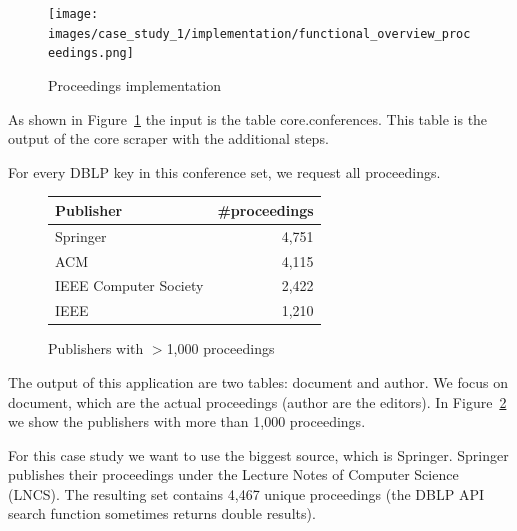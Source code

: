\documentclass{ou-report}
\begin{document}
\begin{figure}[H]
    \centering
    \texttt{[image: images/case\_study\_1/implementation/functional\_overview\_proceedings.png]}
    \caption{Proceedings implementation}
    \label{fig:functional_overview_proceedings}
\end{figure}

As shown in Figure~\ref{fig:functional_overview_proceedings} the input is the
table core.conferences. This table is the output of the core scraper with the 
additional steps.

For every DBLP key in this conference set, we request all proceedings.

\begin{figure}
    \centering
    \begin{tabular}{ lr }
        \toprule
        Publisher & \#proceedings \\
        \midrule
        Springer              & 4,751 \\
        ACM                   & 4,115 \\
        IEEE Computer Society & 2,422 \\
        IEEE                  & 1,210 \\
        \bottomrule
    \end{tabular}
    \caption{Publishers with $>$1,000 proceedings}
    \label{tbl:publisher-proceeding-count}
    
\end{figure}

The output of this application are two tables: document and author. We focus on
document, which are the actual proceedings (author are the editors).
In Figure~\ref{tbl:publisher-proceeding-count} we show the publishers with 
more than 1,000 proceedings.

For this case study we want to use the biggest source, which is Springer. 
Springer publishes their proceedings under the Lecture 
Notes of Computer Science (LNCS). The resulting set contains 4,467 unique 
proceedings (the DBLP API search function sometimes returns double results).
\end{document}
